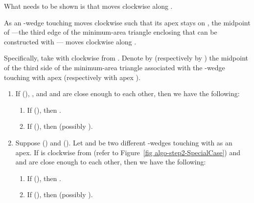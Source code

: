 \documentclass[11pt, oneside]{article}
\begin{document}
What needs to be shown
is that  moves clockwise along .
\begin{lemma}
\label{lemma q turns clockwise and so does m}
As an -wedge  touching  moves clockwise
such that its apex  stays on ,
the midpoint  of  
---the third edge of the minimum-area triangle enclosing 
that can be constructed with ---
moves clockwise along .

Specifically,
take 
with  clockwise from .
Denote by 
(respectively by )
the midpoint of the third side of the minimum-area triangle
associated with the -wedge touching  with apex 
(respectively with apex ).
\begin{enumerate}
\item\label{lemma q turns clockwise and so does m item q' neq q''} 
If  (),
,
and  and  are close enough to each other,
then we have the following:
\begin{enumerate}
\item\label{lemma q turns clockwise and so does m item q' neq q'' item m' neq m''}  
If  (),
then .

\item If  (),
then 
(possibly ).
\end{enumerate}

\item\label{lemma q turns clockwise and so does m item q' = q'' = ui}
Suppose  ()
and  ().
Let  and  be two different -wedges
touching  with  as an apex.
If  is clockwise from 
(refer to Figure~\ref{fig algo-step2-SpecialCase})
and  and  are close enough to each other,
then we have the following:
\begin{enumerate}
\item If  (),
then .

\item If  (),
then 
(possibly ).
\end{enumerate} 
\end{enumerate}
\end{lemma}
\end{document}

